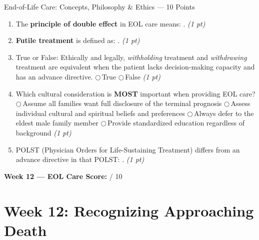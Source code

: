 \documentclass[11pt,letterpaper]{article}
\newcommand{\blank}[1][3cm]{\underline{\hspace{#1}}}
\begin{document}
\begin{diagbox}{End-of-Life Care: Concepts, Philosophy \& Ethics --- 10 Points}
\begin{enumerate}[leftmargin=1.5em, label=\textbf{\arabic*.},start=141]
  \item The \textbf{principle of double effect} in EOL care means:
        \blank[8cm].
        \hfill\textit{(1 pt)}

  \item \textbf{Futile treatment} is defined as: \blank[6cm].
        \hfill\textit{(1 pt)}

  \item True or False: Ethically and legally, \emph{withholding} treatment and
        \emph{withdrawing} treatment are equivalent when the patient lacks decision-making
        capacity and has an advance directive.
        \quad$\bigcirc$\,True \quad$\bigcirc$\,False
        \hfill\textit{(1 pt)}

  \item Which cultural consideration is \textbf{MOST} important when providing EOL care?
        $\bigcirc$\,Assume all families want full disclosure of the terminal prognosis
        $\bigcirc$\,Assess individual cultural and spiritual beliefs and preferences
        $\bigcirc$\,Always defer to the eldest male family member
        $\bigcirc$\,Provide standardized education regardless of background
        \hfill\textit{(1 pt)}

  \item POLST (Physician Orders for Life-Sustaining Treatment) differs from an advance
        directive in that POLST: \blank[6cm].
        \hfill\textit{(1 pt)}

\end{enumerate}

\vspace{0.3cm}
\textbf{Week 12 --- EOL Care Score:} \blank[1cm] / 10
\end{diagbox}

\newpage

\section{Week 12: Recognizing Approaching Death}
\end{document}
